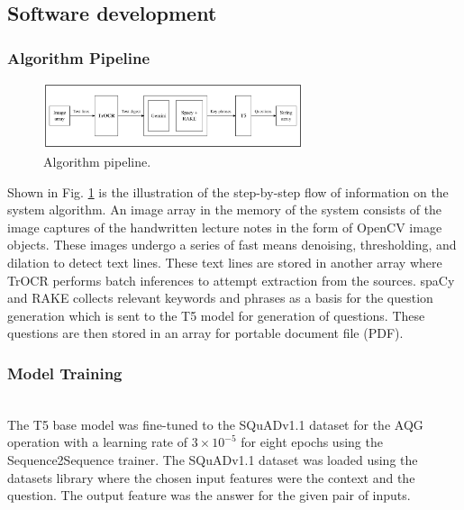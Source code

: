 \documentclass[conference]{IEEEtran}
\begin{document}
\subsection{Software development}
\subsubsection{Algorithm Pipeline}
\hfill
\begin{figure}[H]
\centerline{\includegraphics[width=3in]{pipeline.png}}
\vspace{-0.4cm}
\caption{Algorithm pipeline.} 
\label{pipeline}
\end{figure}
\indent Shown in Fig. \ref{pipeline} is the illustration 
of the step-by-step flow of information on the system 
algorithm. An image array in the memory of the system consists 
of the image captures of the handwritten lecture notes in the 
form of OpenCV image objects. These images undergo 
a series of fast means denoising, thresholding, and 
dilation to detect text lines. These text lines are stored in 
another array where TrOCR performs batch inferences to attempt 
extraction from the sources. spaCy and RAKE collects 
relevant keywords and phrases as a basis for the question generation 
which is sent to the T5 model for generation of questions. 
These questions are then stored in an array for portable document 
file (PDF).
\subsubsection{Model Training}
\hfill \\ 
\indent The T5 base model was fine-tuned to the SQuADv1.1 
dataset for the AQG operation with a learning rate of 
$3 \times 10^{-5}$ for eight epochs using the Sequence2Sequence 
trainer. The SQuADv1.1 dataset was loaded using the
datasets library where the chosen input features 
were the context and the question. The output feature 
was the answer for the given pair of inputs.
\end{document}
